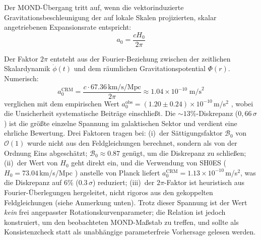 \documentclass[aps,prd,twocolumn,superscriptaddress,nofootinbib]{revtex4-2}
\begin{document}
Der MOND-\"Ubergang tritt auf, wenn die vektorinduzierte Gravitationsbeschleunigung der auf lokale Skalen projizierten, skalar angetriebenen Expansionsrate entspricht:
\begin{equation}
a_0 = \frac{cH_0}{2\pi}
\label{eq:a0}
\end{equation}

Der Faktor $2\pi$ entsteht aus der Fourier-Beziehung zwischen der zeitlichen Skalardynamik $\dot{\phi}(t)$ und dem r\"aumlichen Gravitationspotential $\Phi(r)$. Numerisch:
\begin{equation}
a_0^{\mathrm{CRM}} = \frac{c \cdot 67.36\,\mathrm{km/s/Mpc}}{2\pi} \approx 1.04 \times 10^{-10}\;\mathrm{m/s}^2
\end{equation}
verglichen mit dem empirischen Wert $a_0^{\mathrm{obs}} = (1.20 \pm 0.24) \times 10^{-10}$\,m/s$^2$ \cite{McGaugh2016}, wobei die Unsicherheit systematische Beitr\"age einschlie\ss{}t. Die $\sim 13\%$-Diskrepanz ($0{,}66\,\sigma$) ist die gr\"o\ss{}te einzelne Spannung im galaktischen Sektor und verdient eine ehrliche Bewertung. Drei Faktoren tragen bei: (i)~der S\"attigungsfaktor $\mathcal{B}_0$ von $\mathcal{O}(1)$ wurde nicht aus den Feldgleichungen berechnet, sondern als von der Ordnung Eins abgesch\"atzt; $\mathcal{B}_0 \approx 0.87$ gen\"ugt, um die Diskrepanz zu schlie\ss{}en; (ii)~der Wert von $H_0$ geht direkt ein, und die Verwendung von SH0ES ($H_0 = 73.04$\,km/s/Mpc \cite{Riess2022}) anstelle von Planck liefert $a_0^{\mathrm{CRM}} = 1.13 \times 10^{-10}$\,m/s$^2$, was die Diskrepanz auf $6\%$ ($0.3\,\sigma$) reduziert; (iii)~der $2\pi$-Faktor ist heuristisch aus Fourier-\"Uberlegungen hergeleitet, nicht rigoros aus den gekoppelten Feldgleichungen (siehe Anmerkung unten). Trotz dieser Spannung ist der Wert \textit{kein} frei angepasster Rotationskurvenparameter; die Relation ist jedoch konstruiert, um den beobachteten MOND-Ma\ss{}stab zu treffen, und sollte als Konsistenzcheck statt als unabh\"angige parameterfreie Vorhersage gelesen werden.
\end{document}
